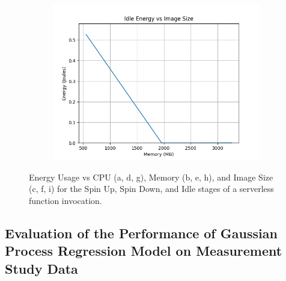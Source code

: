 \documentclass[times, 10pt,twocolumn]{article}
\begin{document}
\begin{figure}[ht]
\begin{subfigure}[b]{0.3\textwidth}
      \includegraphics[width=\textwidth]{imgs/container_study/idle_vs_img.png}
     \caption{}
     \label{fig:idle_img}
   \end{subfigure}
   
   \caption{Energy Usage vs CPU (a, d, g), Memory (b, e, h), and Image Size (c, f, i) for the Spin Up, Spin Down, and Idle stages of a serverless function invocation.}
   \label{fig:energy_stages}
 \end{figure}
 \subsection{Evaluation of the Performance of Gaussian Process Regression Model on Measurement Study Data }
 \label{appendix:regression_model_measurement_study}
\end{document}
